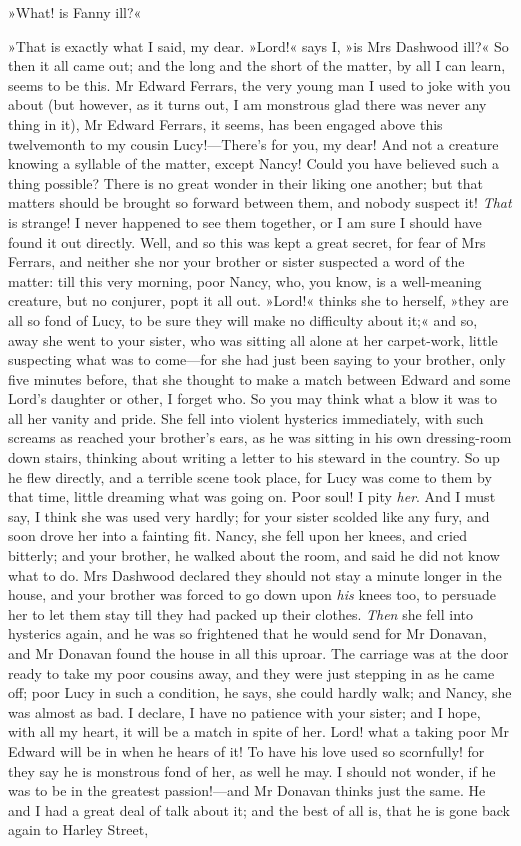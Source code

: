 »What! is Fanny ill?«

»That is exactly what I said, my dear. »Lord!« says I, »is Mrs Dashwood ill?« So then it all came out; and the long and the short of the matter, by all I can learn, seems to be this. Mr Edward Ferrars, the very young man I used to joke with you about (but however, as it turns out, I am monstrous glad there was never any thing in it), Mr Edward Ferrars, it seems, has been engaged above this twelvemonth to my cousin Lucy!—There’s for you, my dear! And not a creature knowing a syllable of the matter, except Nancy! Could you have believed such a thing possible? There is no great wonder in their liking one another; but that matters should be brought so forward between them, and nobody suspect it! \textit{That} is strange! I never happened to see them together, or I am sure I should have found it out directly. Well, and so this was kept a great secret, for fear of Mrs Ferrars, and neither she nor your brother or sister suspected a word of the matter: till this very morning, poor Nancy, who, you know, is a well-meaning creature, but no conjurer, popt it all out. »Lord!« thinks she to herself, »they are all so fond of Lucy, to be sure they will make no difficulty about it;« and so, away she went to your sister, who was sitting all alone at her carpet-work, little suspecting what was to come—for she had just been saying to your brother, only five minutes before, that she thought to make a match between Edward and some Lord’s daughter or other, I forget who. So you may think what a blow it was to all her vanity and pride. She fell into violent hysterics immediately, with such screams as reached your brother’s ears, as he was sitting in his own dressing-room down stairs, thinking about writing a letter to his steward in the country. So up he flew directly, and a terrible scene took place, for Lucy was come to them by that time, little dreaming what was going on. Poor soul! I pity \textit{her}. And I must say, I think she was used very hardly; for your sister scolded like any fury, and soon drove her into a fainting fit. Nancy, she fell upon her knees, and cried bitterly; and your brother, he walked about the room, and said he did not know what to do. Mrs Dashwood declared they should not stay a minute longer in the house, and your brother was forced to go down upon \textit{his} knees too, to persuade her to let them stay till they had packed up their clothes. \textit{Then} she fell into hysterics again, and he was so frightened that he would send for Mr Donavan, and Mr Donavan found the house in all this uproar. The carriage was at the door ready to take my poor cousins away, and they were just stepping in as he came off; poor Lucy in such a condition, he says, she could hardly walk; and Nancy, she was almost as bad. I declare, I have no patience with your sister; and I hope, with all my heart, it will be a match in spite of her. Lord! what a taking poor Mr Edward will be in when he hears of it! To have his love used so scornfully! for they say he is monstrous fond of her, as well he may. I should not wonder, if he was to be in the greatest passion!—and Mr Donavan thinks just the same. He and I had a great deal of talk about it; and the best of all is, that he is gone back again to Harley Street, 